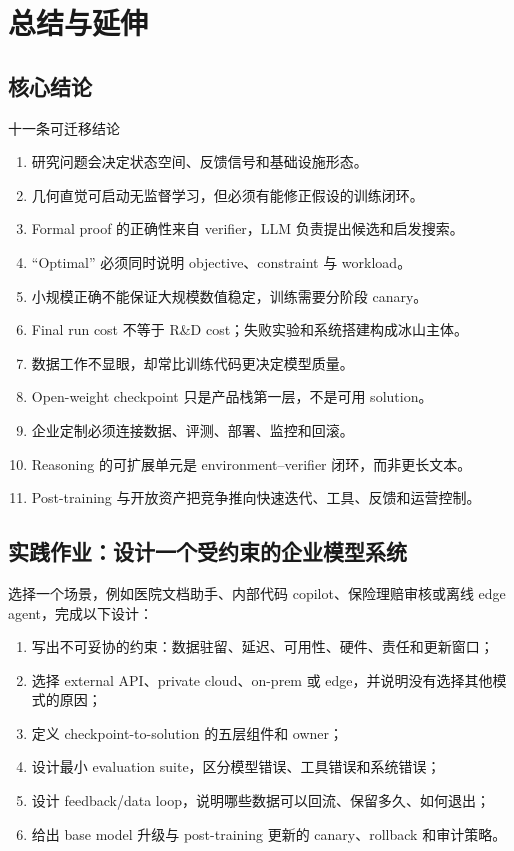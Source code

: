 \documentclass[a4paper]{article}
\begin{document}
\section{总结与延伸}

\subsection{核心结论}

\begin{importantbox}{十一条可迁移结论}
\begin{enumerate}
  \item 研究问题会决定状态空间、反馈信号和基础设施形态。
  \item 几何直觉可启动无监督学习，但必须有能修正假设的训练闭环。
  \item Formal proof 的正确性来自 verifier，LLM 负责提出候选和启发搜索。
  \item “Optimal” 必须同时说明 objective、constraint 与 workload。
  \item 小规模正确不能保证大规模数值稳定，训练需要分阶段 canary。
  \item Final run cost 不等于 R\&D cost；失败实验和系统搭建构成冰山主体。
  \item 数据工作不显眼，却常比训练代码更决定模型质量。
  \item Open-weight checkpoint 只是产品栈第一层，不是可用 solution。
  \item 企业定制必须连接数据、评测、部署、监控和回滚。
  \item Reasoning 的可扩展单元是 environment--verifier 闭环，而非更长文本。
  \item Post-training 与开放资产把竞争推向快速迭代、工具、反馈和运营控制。
\end{enumerate}
\end{importantbox}

\subsection{实践作业：设计一个受约束的企业模型系统}

选择一个场景，例如医院文档助手、内部代码 copilot、保险理赔审核或离线 edge agent，完成以下设计：

\begin{enumerate}
  \item 写出不可妥协的约束：数据驻留、延迟、可用性、硬件、责任和更新窗口；
  \item 选择 external API、private cloud、on-prem 或 edge，并说明没有选择其他模式的原因；
  \item 定义 checkpoint-to-solution 的五层组件和 owner；
  \item 设计最小 evaluation suite，区分模型错误、工具错误和系统错误；
  \item 设计 feedback/data loop，说明哪些数据可以回流、保留多久、如何退出；
  \item 给出 base model 升级与 post-training 更新的 canary、rollback 和审计策略。
\end{enumerate}
\end{document}
